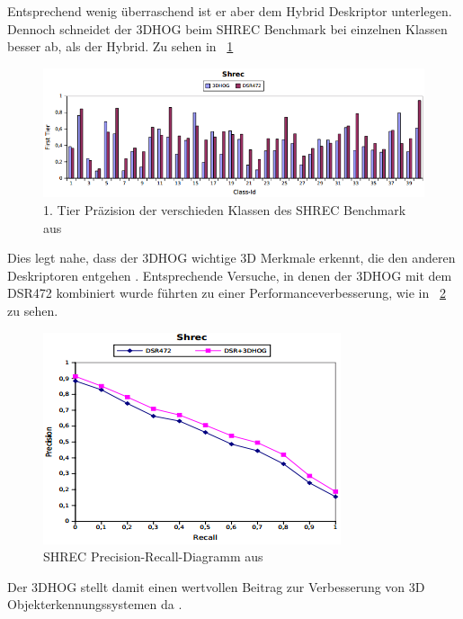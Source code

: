  Entsprechend wenig überraschend ist er aber dem Hybrid Deskriptor unterlegen. Dennoch schneidet der 3DHOG beim SHREC Benchmark bei einzelnen Klassen besser ab, als der Hybrid. Zu sehen in \figurename~\ref{SHREC_3DHOG_DSR472} 

 \begin{figure}[thpb]
 	\centering
 	\includegraphics[width=\linewidth]{2-Hauptteil/pics/SHREC_3DHOG_DSR472.png}
 	\caption{1. Tier Präzision der verschieden Klassen des SHREC Benchmark aus \cite{scherer2010histograms}}
 	\label{SHREC_3DHOG_DSR472}
 \end{figure}
 
 Dies legt nahe, dass der 3DHOG wichtige 3D Merkmale erkennt, die den anderen Deskriptoren entgehen \cite{scherer2010histograms}.
\newline
Entsprechende Versuche, in denen der 3DHOG mit dem DSR472 kombiniert wurde führten zu einer Performanceverbesserung, wie in \figurename~\ref{SHREC_TEAM_3DHOG_DSR472} zu sehen. 

\begin{figure}[thpb]
	\centering
	\includegraphics[width=\linewidth]{2-Hauptteil/pics/SHREC_TEAM_3DHOG_DSR472.png}
	\caption{SHREC Precision-Recall-Diagramm aus \cite{scherer2010histograms}}
	\label{SHREC_TEAM_3DHOG_DSR472}
\end{figure}

Der 3DHOG stellt damit einen wertvollen Beitrag zur Verbesserung von 3D Objekterkennungssystemen da \cite{scherer2010histograms}.
